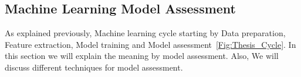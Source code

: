 \begin{figure}[!t]
  \centering
\end{figure}%


\subsection{Machine Learning Model Assessment}

As explained previously, Machine learning cycle starting by Data preparation, Feature extraction, Model training and Model assessment~\ref{Fig:Thesis_Cycle}. In this section we will explain the meaning by model assessment. Also, We will discuss different techniques for model assessment.

